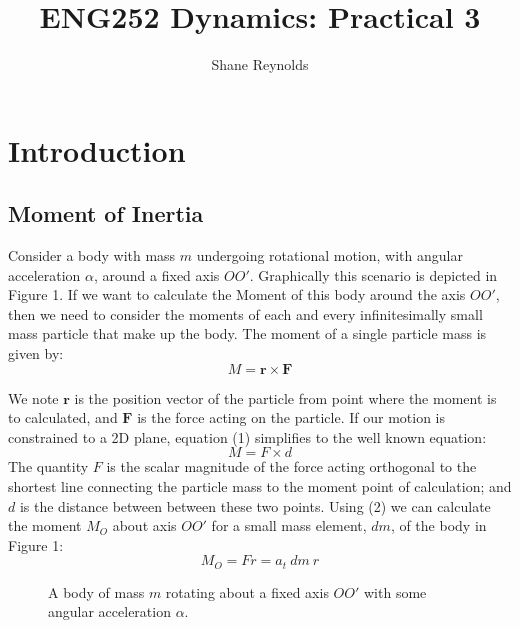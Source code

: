 \documentclass[a4paper]{article}
\begin{document}
\title{ENG252 Dynamics: Practical 3}
\author{Shane Reynolds}
\maketitle

\section{Introduction}
\subsection{Moment of Inertia}
Consider a body with mass $m$ undergoing rotational motion, with angular acceleration $\alpha$, around a fixed axis $OO'$. Graphically this scenario is depicted in Figure 1. If we want to calculate the Moment of this body around the axis $OO'$, then we need to consider the moments of each and every infinitesimally small mass particle that make up the body. The moment of a single particle mass is given by:
\begin{equation}
M = \boldsymbol{r} \times \boldsymbol{F}
\end{equation}

We note $\boldsymbol{r}$ is the position vector of the particle from point where the moment is to calculated, and $\boldsymbol{F}$ is the force acting on the particle. If our motion is constrained to a 2D plane, equation (1) simplifies to the well known equation:
\begin{equation}
M = F \times d
\end{equation}
The quantity $F$ is the scalar magnitude of the force acting orthogonal to the shortest line connecting the particle mass to the moment point of calculation; and $d$ is the distance between between these two points. Using (2) we can calculate the moment $M_O$ about axis $OO'$ for a small mass element, $dm$, of the body in Figure 1:
\begin{equation}
	M_O = Fr = a_t \ dm \ r 
\end{equation}

\begin{figure}[h]
	\centering
	\caption{A body of mass $m$ rotating about a fixed axis $OO'$ with some angular acceleration $\alpha$.}
\end{figure}
\end{document}
